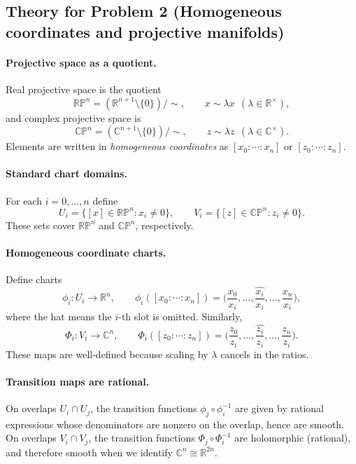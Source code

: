 \documentclass[12pt,a4paper]{article}
\theoremstyle{plain}
\theoremstyle{definition}      %
\begin{document}

\subsection*{Theory for Problem 2 (Homogeneous coordinates and projective manifolds)}

\paragraph{Projective space as a quotient.}
Real projective space is the quotient
\[
\mathbb{RP}^n = (\mathbb R^{n+1}\setminus\{0\})/\sim,
\qquad
x\sim \lambda x \ \ (\lambda\in\mathbb R^\times),
\]
and complex projective space is
\[
\mathbb{CP}^n = (\mathbb C^{n+1}\setminus\{0\})/\sim,
\qquad
z\sim \lambda z \ \ (\lambda\in\mathbb C^\times).
\]
Elements are written in \emph{homogeneous coordinates} as $[x_0:\cdots:x_n]$ or $[z_0:\cdots:z_n]$.

\paragraph{Standard chart domains.}
For each $i=0,\dots,n$ define
\[
U_i=\{[x]\in\mathbb{RP}^n: x_i\neq 0\},
\qquad
V_i=\{[z]\in\mathbb{CP}^n: z_i\neq 0\}.
\]
These sets cover $\mathbb{RP}^n$ and $\mathbb{CP}^n$, respectively.

\paragraph{Homogeneous coordinate charts.}
Define charts
\[
\phi_i:U_i\to\mathbb R^n,
\qquad
\phi_i([x_0:\cdots:x_n])=
\Big(\frac{x_0}{x_i},\dots,\widehat{\frac{x_i}{x_i}},\dots,\frac{x_n}{x_i}\Big),
\]
where the hat means the $i$-th slot is omitted.
Similarly,
\[
\Phi_i:V_i\to\mathbb C^n,
\qquad
\Phi_i([z_0:\cdots:z_n])=
\Big(\frac{z_0}{z_i},\dots,\widehat{\frac{z_i}{z_i}},\dots,\frac{z_n}{z_i}\Big).
\]
These maps are well-defined because scaling by $\lambda$ cancels in the ratios.

\paragraph{Transition maps are rational.}
On overlaps $U_i\cap U_j$, the transition functions $\phi_j\circ\phi_i^{-1}$ are given by rational expressions
whose denominators are nonzero on the overlap, hence are smooth.
On overlaps $V_i\cap V_j$, the transition functions $\Phi_j\circ\Phi_i^{-1}$ are holomorphic (rational),
and therefore smooth when we identify $\mathbb C^n\cong \mathbb R^{2n}$.
\end{document}
